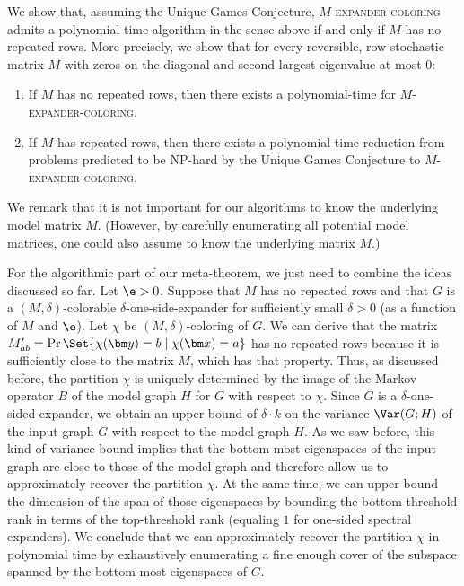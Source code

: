 We show that, assuming the Unique Games Conjecture, \(M\)-\textsc{expander-coloring} admits a polynomial-time algorithm in the sense above if and only if \(M\) has no repeated rows.
More precisely, we show that for every reversible, row stochastic matrix \(M\) with zeros on the diagonal and second largest eigenvalue at most \(0\):

\begin{enumerate}
\item If \(M\) has no repeated rows, then there exists a polynomial-time for \(M\)-\textsc{expander-coloring}.
\item If \(M\) has repeated rows, then there exists a polynomial-time reduction from problems predicted to be NP-hard by the Unique Games Conjecture to \(M\)-\textsc{expander-coloring}.
\end{enumerate}

We remark that it is not important for our algorithms to know the underlying model matrix \(M\).
(However, by carefully enumerating all potential model matrices, one could also assume to know the underlying matrix \(M\).)

For the algorithmic part of our meta-theorem, we just need to combine the ideas discussed so far.
Let \(\e>0\).
Suppose that \(M\) has no repeated rows and that \(G\) is a \((M,\delta)\)-colorable \(\delta\)-one-side-expander for sufficiently small \(\delta>0\) (as a function of \(M\) and \(\e\)).
Let \(\chi\) be \((M,\delta)\)-coloring of \(G\).
We can derive that the matrix \(M'_{ab}=\Pr\Set{\chi(\bm y)=b\mid \chi(\bm x)=a}\) has no repeated rows because it is sufficiently close to the matrix \(M\), which has that property.
Thus, as discussed before, the partition \(\chi\) is uniquely determined by the image of the Markov operator \(B\) of the model graph \(H\) for \(G\) with respect to \(\chi\).
Since \(G\) is a \(\delta\)-one-sided-expander, we obtain an upper bound of \(\delta\cdot k\) on the variance \(\Var(G;H)\) of the input graph \(G\) with respect to the model graph \(H\).
As we saw before, this kind of variance bound implies that the bottom-most eigenspaces of the input graph are close to those of the model graph and therefore allow us to approximately recover the partition \(\chi\).
At the same time, we can upper bound the dimension of the span of those eigenspaces by bounding the bottom-threshold rank in terms of the top-threshold rank (equaling \(1\) for one-sided spectral expanders).
We conclude that we can approximately recover the partition \(\chi\) in polynomial time by exhaustively enumerating a fine enough cover of the subspace spanned by the bottom-most eigenspaces of \(G\).

